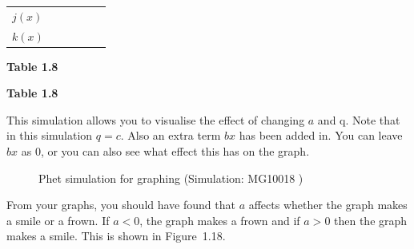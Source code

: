 \begin{table}[H]
\begin{center}
\begin{xtabular}[t]{|l|l|l|l|l|l|}
    $j(x)$
    &
&
&
&
&
\tabularnewline{}
    $k(x)$
    &
&
&
&
&
\tabularnewline{}
\end{xtabular}
\end{center}
\begin{center}{\small\bfseries Table 1.8}\end{center}
\begin{caption}{\small\bfseries Table 1.8}\end{caption}
\end{table}
\par
This simulation allows you to visualise the effect of changing $a$ and q. Note that in this simulation $q = c$. Also an extra term $bx$ has been added in. You can leave $bx$ as $0$, or you can also see what effect this has on the graph.
\par 
\setcounter{subfigure}{0}
\begin{figure}[H] %
\textnormal{Phet simulation for graphing}\vspace{.1in} \nopagebreak
\label{m39345*phet!!!underscore!!!sim}\label{m39345*phet-simulation}
 { (Simulation:  MG10018 )}
\vspace{2pt}
\vspace{.1in}
\end{figure}       

\par From your graphs, you should have found that $a$ affects whether the graph makes a smile or a frown. If $a<0$, the graph makes a frown and if $a>0$ then the graph makes a smile. This is shown in Figure~1.18.\par 

